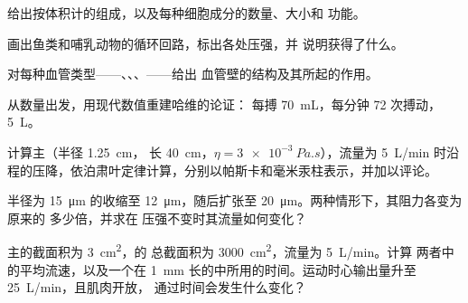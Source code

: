 \begin{exercise}[$\star$]\label{exo:b2:blood-circulation:1}
给出按体积计的组成，以及每种细胞成分的数量、大小和
功能。
\end{exercise}

\begin{exercise}[$\star$]\label{exo:b2:blood-circulation:2}
画出鱼类和哺乳动物的循环回路，标出各处压强，并
说明获得了什么。
\end{exercise}

\begin{exercise}[$\star$]\label{exo:b2:blood-circulation:3}
对每种血管类型——、、、——给出
血管壁的结构及其所起的作用。
\end{exercise}

\begin{exercise}[$\star$]\label{exo:b2:blood-circulation:4}
从数量出发，用现代数值重建哈维的论证：
每搏 \qty{70}{mL}，每分钟 \num{72} 次搏动， \qty{5}{L}。
\end{exercise}

\begin{exercise}[$\star\star$]\label{exo:b2:blood-circulation:5}
计算主（半径 \qty{1.25}{cm}，
长 \qty{40}{cm}，$\eta = \qty{3e-3}{Pa.s}$），流量为
\qty{5}{L/min} 时沿程的压降，依泊肃叶定律计算，分别以帕斯卡和毫米汞柱表示，并加以评论。
\end{exercise}

\begin{exercise}[$\star\star$]\label{exo:b2:blood-circulation:6}
半径为 \qty{15}{\micro m} 的收缩至
\qty{12}{\micro m}，随后扩张至 \qty{20}{\micro m}。两种情形下，其阻力各变为原来的
多少倍，并求在
压强不变时其流量如何变化？
\end{exercise}

\begin{exercise}[$\star\star$]\label{exo:b2:blood-circulation:7}
主的截面积为 \qty{3}{cm^2}，的
总截面积为 \qty{3000}{cm^2}，流量为 \qty{5}{L/min}。计算
两者中的平均流速，以及一个在
\qty{1}{mm} 长的中所用的时间。运动时心输出量升至
\qty{25}{L/min}，且肌肉开放，
通过时间会发生什么变化？
\end{exercise}

